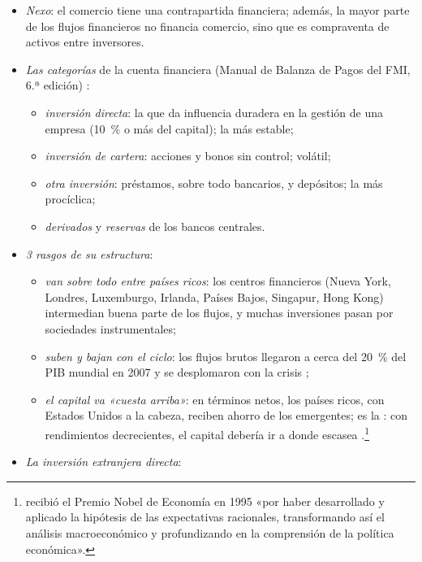 \documentclass[11pt]{article}
\begin{document}
\begin{itemize}
\item \emph{Nexo}: el comercio tiene una contrapartida financiera; además, la mayor parte de los flujos financieros no financia comercio, sino que es compraventa de activos entre inversores.
\item \emph{Las categorías} de la cuenta financiera (Manual de Balanza de Pagos del FMI, 6.ª edición) :
  \begin{itemize}
  \item \emph{inversión directa}: la que da influencia duradera en la gestión de una empresa (10~\% o más del capital); la más estable;
  \item \emph{inversión de cartera}: acciones y bonos sin control; volátil;
  \item \emph{otra inversión}: préstamos, sobre todo bancarios, y depósitos; la más procíclica;
  \item \emph{derivados} y \emph{reservas} de los bancos centrales.
  \end{itemize}
\item \emph{3 rasgos de su estructura}:
  \begin{itemize}
  \item \emph{van sobre todo entre países ricos}: los centros financieros (Nueva York, Londres, Luxemburgo, Irlanda, Países Bajos, Singapur, Hong Kong) intermedian buena parte de los flujos, y muchas inversiones pasan por sociedades instrumentales;
  \item \emph{suben y bajan con el ciclo}: los flujos brutos llegaron a cerca del 20~\% del PIB mundial en 2007 y se desplomaron con la crisis\nocite{MGI2013Financial} ;
  \item \emph{el capital va «cuesta arriba»}: en términos netos, los países ricos, con Estados Unidos a la cabeza, reciben ahorro de los emergentes; es la : con rendimientos decrecientes, el capital debería ir a donde escasea\nocite{Lucas1990Why,GourinchasJeanne2013Capital} .\footnote{ recibió el Premio Nobel de Economía en 1995 «por haber desarrollado y aplicado la hipótesis de las expectativas racionales, transformando así el análisis macroeconómico y profundizando en la comprensión de la política económica»\nocite{Nobel1995Lucas}.}
  \end{itemize}
\item \emph{La inversión extranjera directa}\nocite{UNCTAD2026WIR}:
  \begin{itemize}

\end{itemize}
\end{itemize}
\end{document}
